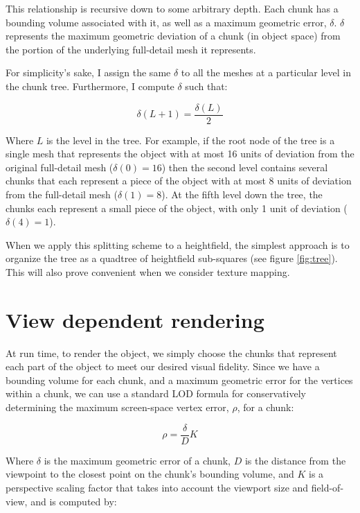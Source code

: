 \documentclass[12pt]{article}
\begin{document}
This relationship is recursive down to some arbitrary depth.  Each
chunk has a bounding volume associated with it, as well as a maximum
geometric error, $\delta$.  $\delta$ represents the maximum geometric
deviation of a chunk (in object space) from the portion of the
underlying full-detail mesh it represents.
 
For simplicity's sake, I assign the same $\delta$ to all the meshes at a
particular level in the chunk tree.  Furthermore, I compute $\delta$ such
that:

\begin{equation}
\delta(L + 1) = \frac{ \delta(L) }{ 2 }
\label{eq1}
\end{equation}

Where $L$ is the level in the tree.  For example, if the root node of
the tree is a single mesh that represents the object with at most 16
units of deviation from the original full-detail mesh ($\delta(0) = 16$)
then the second level contains several chunks that each represent a
piece of the object with at most 8 units of deviation from the
full-detail mesh ($\delta(1) = 8$).  At the fifth level down the tree, the
chunks each represent a small piece of the object, with only 1 unit of
deviation ($\delta(4) = 1$).
 
When we apply this splitting scheme to a heightfield, the simplest
approach is to organize the tree as a quadtree of heightfield
sub-squares (see figure \ref{fig:tree}).  This will also prove
convenient when we consider texture mapping.
 
\section{View dependent rendering}

At run time, to render the object, we simply choose the chunks that
represent each part of the object to meet our desired visual fidelity.
Since we have a bounding volume for each chunk, and a maximum
geometric error for the vertices within a chunk, we can use a standard
LOD formula for conservatively determining the maximum screen-space
vertex error, $\rho$, for a chunk:

\begin{equation}
\rho = \frac{ \delta }{ D } K
\label{eq2}
\end{equation}
 
Where $\delta$ is the maximum geometric error of a chunk, $D$ is the
distance from the viewpoint to the closest point on the chunk's
bounding volume, and $K$ is a perspective scaling factor that takes
into account the viewport size and field-of-view, and is computed by:
 
\end{document}
